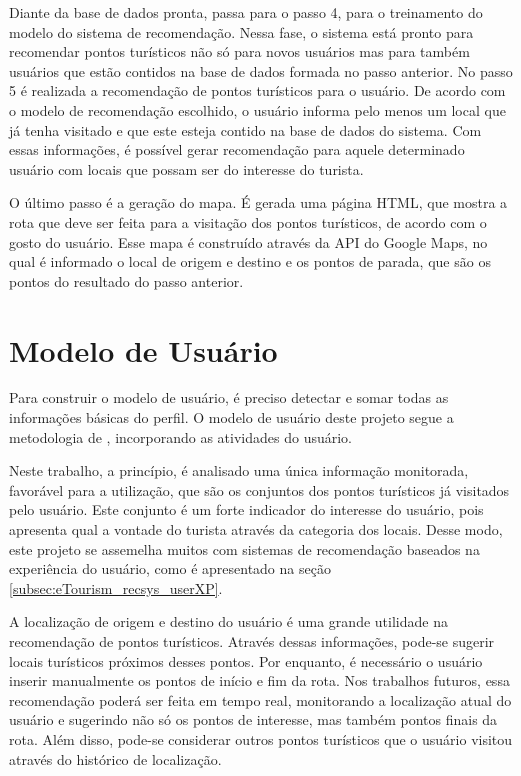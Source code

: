 Diante da base de dados pronta, passa para o passo 4, para o treinamento do modelo do sistema de recomendação. Nessa fase, o sistema está pronto para recomendar pontos turísticos não só para novos usuários mas para também usuários que estão contidos na base de dados formada no passo anterior. No passo 5 é realizada a recomendação de pontos turísticos para o usuário. De acordo com o modelo de recomendação escolhido, o usuário informa pelo menos um local que já tenha visitado e que este esteja contido na base de dados do sistema. Com essas informações, é possível gerar recomendação para aquele determinado usuário com locais que possam ser do interesse do turista.

O último passo é a geração do mapa. É gerada uma página HTML, que mostra a rota que deve ser feita para a visitação dos pontos turísticos, de acordo com o gosto do usuário. Esse mapa é construído através da API do Google Maps, no qual é informado o local de origem e destino e os pontos de parada, que são os pontos do resultado do passo anterior.

\section{Modelo de Usuário}

Para construir o modelo de usuário, é preciso detectar e somar todas as informações básicas do perfil. O modelo de usuário deste projeto segue a metodologia de \cite{Brusilovsky:2001:AH:598284.598341}, incorporando as atividades do usuário. 

Neste trabalho, a princípio, é analisado uma única informação monitorada, favorável para a utilização, que são os conjuntos dos pontos turísticos já visitados pelo usuário. Este conjunto é um forte indicador do interesse do usuário, pois apresenta qual a vontade do turista através da categoria dos locais. Desse modo, este projeto se assemelha muitos com sistemas de recomendação baseados na experiência do usuário, como é apresentado na seção \ref{subsec:eTourism_recsys_userXP}.

A localização de origem e destino do usuário é uma grande utilidade na recomendação de pontos turísticos. Através dessas informações, pode-se sugerir locais turísticos próximos desses pontos. Por enquanto, é necessário o usuário inserir manualmente os pontos de início e fim da rota. Nos trabalhos futuros, essa recomendação poderá ser feita em tempo real, monitorando a localização atual do usuário e sugerindo não só os pontos de interesse, mas também pontos finais da rota. Além disso, pode-se considerar outros pontos turísticos que o usuário visitou através do histórico de localização.

